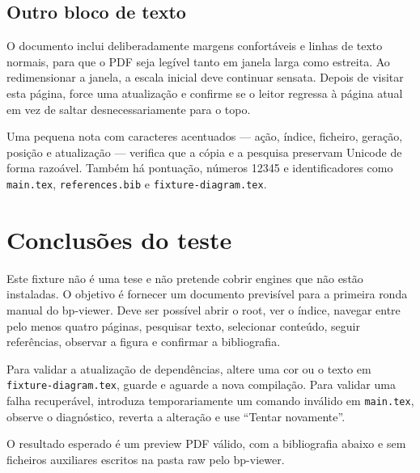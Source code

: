 \documentclass[11pt,a4paper]{article}
\begin{document}
\subsection{Outro bloco de texto}
\label{subsec:mais-texto}
O documento inclui deliberadamente margens confortáveis e linhas de texto
normais, para que o PDF seja legível tanto em janela larga como estreita. Ao
redimensionar a janela, a escala inicial deve continuar sensata. Depois de
visitar esta página, force uma atualização e confirme se o leitor regressa à
página atual em vez de saltar desnecessariamente para o topo.

Uma pequena nota com caracteres acentuados — ação, índice, ficheiro, geração,
posição e atualização — verifica que a cópia e a pesquisa preservam Unicode de
forma razoável. Também há pontuação, números 12345 e identificadores como
\texttt{main.tex}, \texttt{references.bib} e \texttt{fixture-diagram.tex}.

\newpage
\section{Conclusões do teste}
\label{sec:conclusoes}

Este fixture não é uma tese e não pretende cobrir engines que não estão
instaladas. O objetivo é fornecer um documento previsível para a primeira
ronda manual do bp-viewer. Deve ser possível abrir o root, ver o índice,
navegar entre pelo menos quatro páginas, pesquisar texto, selecionar conteúdo,
seguir referências, observar a figura e confirmar a bibliografia.

Para validar a atualização de dependências, altere uma cor ou o texto em
\texttt{fixture-diagram.tex}, guarde e aguarde a nova compilação. Para validar
uma falha recuperável, introduza temporariamente um comando inválido em
\texttt{main.tex}, observe o diagnóstico, reverta a alteração e use
``Tentar novamente''.

O resultado esperado é um preview PDF válido, com a bibliografia abaixo e sem
ficheiros auxiliares escritos na pasta raw pelo bp-viewer.

\clearpage
{}


\end{document}
